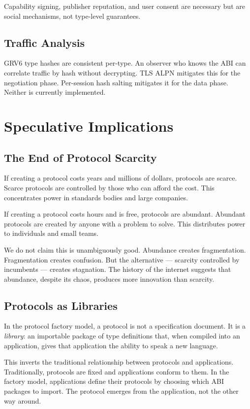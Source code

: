 \documentclass[11pt,a4paper]{article}
\begin{document}
Capability signing, publisher reputation, and user consent are necessary
but are social mechanisms, not type-level guarantees.

\subsection{Traffic Analysis}

GRV6 type hashes are consistent per-type. An observer who knows the ABI
can correlate traffic by hash without decrypting. TLS ALPN mitigates
this for the negotiation phase. Per-session hash salting mitigates it
for the data phase. Neither is currently implemented.

\section{Speculative Implications}

\subsection{The End of Protocol Scarcity}

If creating a protocol costs years and millions of dollars, protocols
are scarce. Scarce protocols are controlled by those who can afford the
cost. This concentrates power in standards bodies and large companies.

If creating a protocol costs hours and is free, protocols are abundant.
Abundant protocols are created by anyone with a problem to solve. This
distributes power to individuals and small teams.

We do not claim this is unambiguously good. Abundance creates
fragmentation. Fragmentation creates confusion. But the alternative ---
scarcity controlled by incumbents --- creates stagnation. The history of
the internet suggests that abundance, despite its chaos, produces more
innovation than scarcity.

\subsection{Protocols as Libraries}

In the protocol factory model, a protocol is not a specification
document. It is a \emph{library}: an importable package of type
definitions that, when compiled into an application, gives that
application the ability to speak a new language.

This inverts the traditional relationship between protocols and
applications. Traditionally, protocols are fixed and applications
conform to them. In the factory model, applications define their
protocols by choosing which ABI packages to import. The protocol
emerges from the application, not the other way around.
\end{document}
